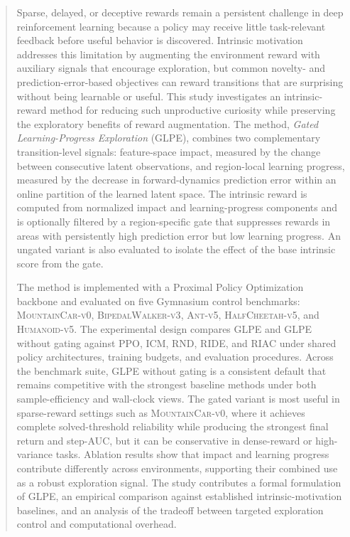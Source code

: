 \begin{abstract}
\vspace{0.25in}
Sparse, delayed, or deceptive rewards remain a persistent challenge in deep reinforcement learning because a policy may receive little task-relevant feedback before useful behavior is discovered.
Intrinsic motivation addresses this limitation by augmenting the environment reward with auxiliary signals that encourage exploration, but common novelty- and prediction-error-based objectives can reward transitions that are surprising without being learnable or useful.
This study investigates an intrinsic-reward method for reducing such unproductive curiosity while preserving the exploratory benefits of reward augmentation.
The method, \emph{Gated Learning-Progress Exploration} (GLPE), combines two complementary transition-level signals: feature-space impact, measured by the change between consecutive latent observations, and region-local learning progress, measured by the decrease in forward-dynamics prediction error within an online partition of the learned latent space.
The intrinsic reward is computed from normalized impact and learning-progress components and is optionally filtered by a region-specific gate that suppresses rewards in areas with persistently high prediction error but low learning progress.
An ungated variant is also evaluated to isolate the effect of the base intrinsic score from the gate.

The method is implemented with a Proximal Policy Optimization backbone and evaluated on five Gymnasium control benchmarks: \textsc{MountainCar-v0}, \textsc{BipedalWalker-v3}, \textsc{Ant-v5}, \textsc{HalfCheetah-v5}, and \textsc{Humanoid-v5}.
The experimental design compares GLPE and GLPE without gating against PPO, ICM, RND, RIDE, and RIAC under shared policy architectures, training budgets, and evaluation procedures.
Across the benchmark suite, GLPE without gating is a consistent default that remains competitive with the strongest baseline methods under both sample-efficiency and wall-clock views.
The gated variant is most useful in sparse-reward settings such as \textsc{MountainCar-v0}, where it achieves complete solved-threshold reliability while producing the strongest final return and step-AUC, but it can be conservative in dense-reward or high-variance tasks.
Ablation results show that impact and learning progress contribute differently across environments, supporting their combined use as a robust exploration signal.
The study contributes a formal formulation of GLPE, an empirical comparison against established intrinsic-motivation baselines, and an analysis of the tradeoff between targeted exploration control and computational overhead.
\end{abstract}